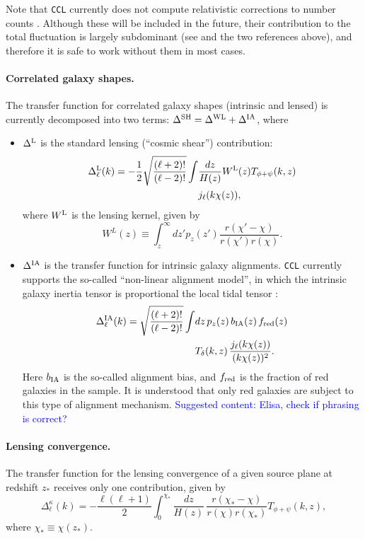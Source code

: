 \documentclass[\docopts]{\docclass}
\newcommand{\cont}[1]{\textcolor{blue}{Suggested content: #1}}
\newcommand{\ccl}{{\tt CCL}\xspace}
\begin{document}
Note that \ccl currently does not compute relativistic corrections to number counts \cite{2011PhRvD..84d3516C,2011PhRvD..84f3505B}. Although these will be included in the future, their contribution to the total fluctuation is largely subdominant (see \cite{GReffects} and the two references above), and therefore it is safe to work without them in most cases.

\paragraph{\bf Correlated galaxy shapes.} The transfer function for correlated galaxy shapes (intrinsic and lensed) is currently decomposed into two terms: $\Delta^{\rm SH}=\Delta^{\rm WL}+\Delta^{\rm IA}$, where
\begin{itemize}
  \item $\Delta^{\rm L}$ is the standard lensing (``cosmic shear'') contribution:
    \begin{align} \label{eq:transfer_lensing}
      \nonumber
      \Delta_\ell^{\rm L}(k)=-\frac{1}{2}\sqrt{\frac{(\ell+2)!}{(\ell-2)!}}\int &\frac{dz}{H(z)} W^{\rm L}(z)T_{\phi+\psi}(k,z)\\
      &j_\ell(k\chi(z)),
    \end{align}
    where $W^{\rm L}$ is the lensing kernel, given by
    \begin{equation}
      W^L(z)\equiv\int_z^\infty dz' p_z(z')\frac{r(\chi'-\chi)}{r(\chi')r(\chi)}.
    \end{equation}
  \item $\Delta^{\rm IA}$ is the transfer function for intrinsic galaxy alignments. \ccl currently supports the so-called ``non-linear alignment model'', in which the intrinsic galaxy inertia tensor is proportional the local tidal tensor \cite{2004PhRvD..70f3526H,2007MNRAS.381.1197H}:
    \begin{align}\nonumber
      \Delta_\ell^{\rm IA}(k)=\sqrt{\frac{(\ell+2)!}{(\ell-2)!}}\int &dz\,p_z(z)\,b_{\rm IA}(z)\,f_{\rm red}(z)\\
      &T_\delta(k,z)\,\frac{j_\ell(k\chi(z))}{(k\chi(z))^2}.
    \end{align}
    Here $b_{\rm IA}$ is the so-called alignment bias, and $f_{\rm red}$ is the fraction of red galaxies in the sample. It is understood that only red galaxies are subject to this type of alignment mechanism. \cont{Elisa, check if phrasing is correct?}
\end{itemize}

\paragraph{\bf Lensing convergence.} The transfer function for the lensing convergence of a given source plane at redshift $z_*$ receives only one contribution, given by
\begin{equation}
  \Delta_\ell^\kappa(k)=-\frac{\ell(\ell+1)}{2}\int_0^{\chi_*}\frac{dz}{H(z)}\,\frac{r(\chi_*-\chi)}{r(\chi)r(\chi_*)}T_{\phi+\psi}(k,z),
\end{equation}
where $\chi_*\equiv\chi(z_*)$.
\end{document}

